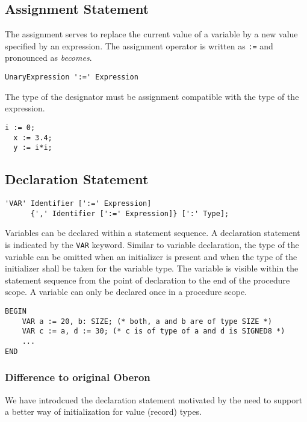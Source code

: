 \documentclass[a4wide,11pt]{article}
\begin{document}
\subsection{Assignment Statement}
The assignment serves to replace the current value of a variable by a new value specified by an expression.
The assignment operator is written as \lstinline":="  and pronounced as \emph{becomes}.

\begin{lstlisting}[style=ebnf]
	UnaryExpression ':=' Expression
\end{lstlisting}

The type of the designator must be assignment compatible with the type of the expression.

\begin{annotation}
\begin{lstlisting}[style=example,caption=Examples of Assignments]
  i := 0;
  x := 3.4;
  y := i*i;
\end{lstlisting}
\end{annotation}

\subsection{Declaration Statement}
\begin{lstlisting}[style=ebnf]
'VAR' Identifier [':=' Expression] 
      {',' Identifier [':=' Expression]} [':' Type];
\end{lstlisting}

Variables can be declared within a statement sequence. A declaration statement is indicated by the \lstinline"VAR" keyword. Similar to variable declaration, the type of the variable can be omitted when an initializer is present and when the type of the initializer shall be taken for the variable type. The variable is visible within the statement sequence from the point of declaration to the end of the procedure scope. A variable can only be declared once in a procedure scope. 

\begin{annotation}
\begin{lstlisting}[style=example]
BEGIN
	VAR a := 20, b: SIZE; (* both, a and b are of type SIZE *)
	VAR c := a, d := 30; (* c is of type of a and d is SIGNED8 *)
	...
END
\end{lstlisting}

\subsubsection{Difference to original Oberon}
We have introdcued the declaration statement motivated by the need to support a better way of initialization for value (record) types.
\end{annotation}
\end{document}
